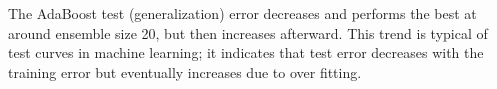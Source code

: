\documentclass[12pt]{article}
\begin{document}
The AdaBoost test (generalization) error decreases and performs the best at around ensemble size 20, but then increases afterward. This trend is typical of test curves in machine learning; it indicates that test error decreases with the training error but eventually increases due to over fitting.

%
%
\end{document}
